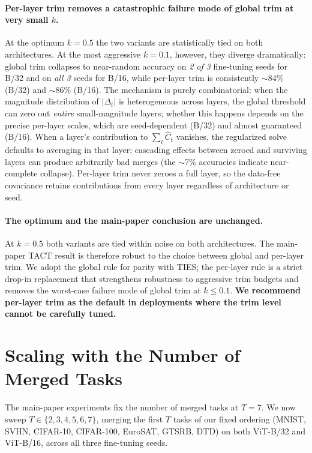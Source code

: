 \documentclass{article}
\theoremstyle{plain}
\theoremstyle{definition}
\theoremstyle{remark}
\begin{document}
\paragraph{Per-layer trim removes a catastrophic failure mode of global trim at very small $k$.}
At the optimum $k\!=\!0.5$ the two variants are statistically tied on both architectures. At the most aggressive $k\!=\!0.1$, however, they diverge dramatically: global trim collapses to near-random accuracy on \emph{2 of 3} fine-tuning seeds for B/32 and on \emph{all 3} seeds for B/16, while per-layer trim is consistently $\sim 84\%$ (B/32) and $\sim 86\%$ (B/16). The mechanism is purely combinatorial: when the magnitude distribution of $|\Delta_t|$ is heterogeneous across layers, the global threshold can zero out \emph{entire} small-magnitude layers; whether this happens depends on the precise per-layer scales, which are seed-dependent (B/32) and almost guaranteed (B/16). When a layer's contribution to $\sum_t \hat C_t$ vanishes, the regularized solve defaults to averaging in that layer; cascading effects between zeroed and surviving layers can produce arbitrarily bad merges (the $\sim$7\% accuracies indicate near-complete collapse). Per-layer trim never zeroes a full layer, so the data-free covariance retains contributions from every layer regardless of architecture or seed.

\paragraph{The optimum and the main-paper conclusion are unchanged.}
At $k=0.5$ both variants are tied within noise on both architectures. The main-paper TACT result is therefore robust to the choice between global and per-layer trim. We adopt the global rule for parity with TIES; the per-layer rule is a strict drop-in replacement that strengthens robustness to aggressive trim budgets and removes the worst-case failure mode of global trim at $k\le 0.1$. \textbf{We recommend per-layer trim as the default in deployments where the trim level cannot be carefully tuned.}

\section{Scaling with the Number of Merged Tasks}
\label{app:task_count}

The main-paper experiments fix the number of merged tasks at $T=7$. We now sweep $T \in \{2,3,4,5,6,7\}$, merging the first $T$ tasks of our fixed ordering (MNIST, SVHN, CIFAR-10, CIFAR-100, EuroSAT, GTSRB, DTD) on both ViT-B/32 and ViT-B/16, across all three fine-tuning seeds.
\end{document}
